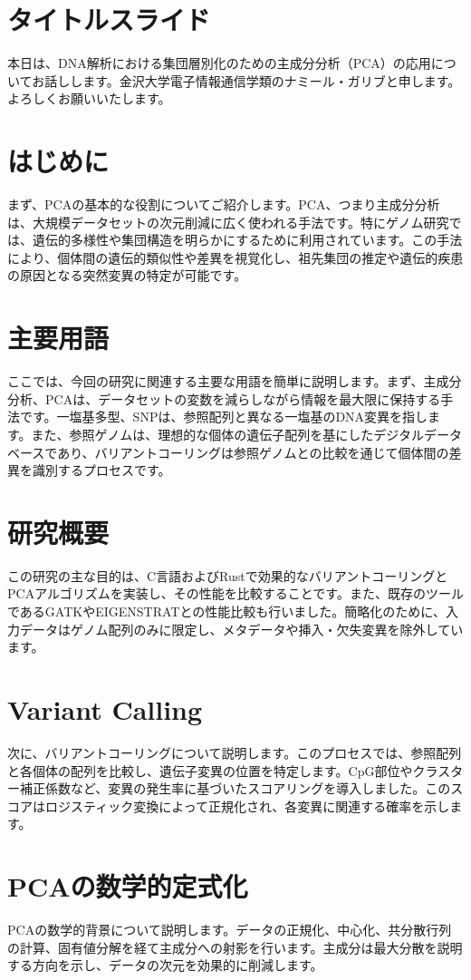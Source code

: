 \documentclass{article}
\begin{document}
\section*{タイトルスライド}
本日は、DNA解析における集団層別化のための主成分分析（PCA）の応用についてお話しします。金沢大学電子情報通信学類のナミール・ガリブと申します。よろしくお願いいたします。

\section*{はじめに}
まず、PCAの基本的な役割についてご紹介します。PCA、つまり主成分分析は、大規模データセットの次元削減に広く使われる手法です。特にゲノム研究では、遺伝的多様性や集団構造を明らかにするために利用されています。この手法により、個体間の遺伝的類似性や差異を視覚化し、祖先集団の推定や遺伝的疾患の原因となる突然変異の特定が可能です。

\section*{主要用語}
ここでは、今回の研究に関連する主要な用語を簡単に説明します。まず、主成分分析、PCAは、データセットの変数を減らしながら情報を最大限に保持する手法です。一塩基多型、SNPは、参照配列と異なる一塩基のDNA変異を指します。また、参照ゲノムは、理想的な個体の遺伝子配列を基にしたデジタルデータベースであり、バリアントコーリングは参照ゲノムとの比較を通じて個体間の差異を識別するプロセスです。

\section*{研究概要}
この研究の主な目的は、C言語およびRustで効果的なバリアントコーリングとPCAアルゴリズムを実装し、その性能を比較することです。また、既存のツールであるGATKやEIGENSTRATとの性能比較も行いました。簡略化のために、入力データはゲノム配列のみに限定し、メタデータや挿入・欠失変異を除外しています。

\section*{Variant Calling}
次に、バリアントコーリングについて説明します。このプロセスでは、参照配列と各個体の配列を比較し、遺伝子変異の位置を特定します。CpG部位やクラスター補正係数など、変異の発生率に基づいたスコアリングを導入しました。このスコアはロジスティック変換によって正規化され、各変異に関連する確率を示します。

\section*{PCAの数学的定式化}
PCAの数学的背景について説明します。データの正規化、中心化、共分散行列の計算、固有値分解を経て主成分への射影を行います。主成分は最大分散を説明する方向を示し、データの次元を効果的に削減します。
\end{document}
